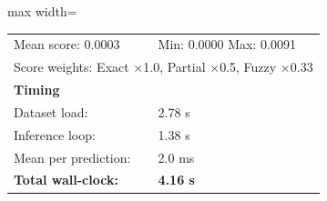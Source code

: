 \begin{table}[htbp]
\begin{adjustbox}{max width=\textwidth}
\begin{tabular}{r p{5cm} r r r r}
\multicolumn{3}{l}{Mean score: 0.0003} & \multicolumn{3}{l}{Min: 0.0000 \quad Max: 0.0091} \\
\multicolumn{6}{l}{Score weights: Exact $\times$1.0, Partial $\times$0.5, Fuzzy $\times$0.33} \\
\midrule
\multicolumn{6}{l}{\textbf{Timing}} \\
\midrule
\multicolumn{3}{l}{Dataset load:} & \multicolumn{3}{l}{2.78 s} \\
\multicolumn{3}{l}{Inference loop:} & \multicolumn{3}{l}{1.38 s} \\
\multicolumn{3}{l}{Mean per prediction:} & \multicolumn{3}{l}{2.0 ms} \\
\multicolumn{3}{l}{\textbf{Total wall-clock:}} & \multicolumn{3}{l}{\textbf{4.16 s}} \\
\bottomrule
\end{tabular}
\end{adjustbox}
\end{table}
